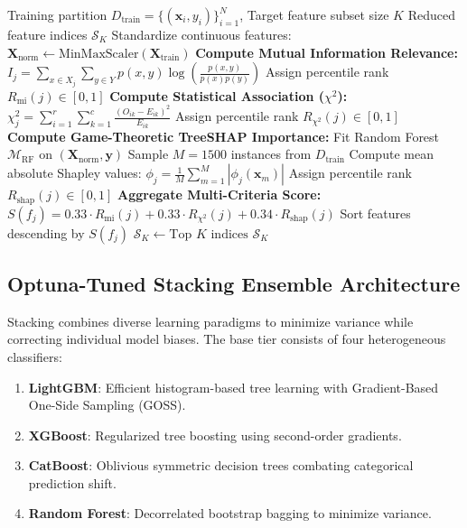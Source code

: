 \documentclass[journal]{IEEEtran}
\begin{document}
\begin{algorithm}[h]
\caption{Leakage-Aware Hybrid Feature Selection}
\label{alg:feature_selection}
\begin{algorithmic}[1]
\REQUIRE Training partition $D_{\text{train}} = \{(\mathbf{x}_i, y_i)\}_{i=1}^N$, Target feature subset size $K$
\ENSURE Reduced feature indices $\mathcal{S}_K$
\STATE Standardize continuous features: $\mathbf{X}_{\text{norm}} \leftarrow \text{MinMaxScaler}(\mathbf{X}_{\text{train}})$
\STATE \textbf{Compute Mutual Information Relevance:}
    \STATE $I_j = \sum_{x \in X_j} \sum_{y \in Y} p(x, y) \log \left( \frac{p(x, y)}{p(x)p(y)} \right)$
    \STATE Assign percentile rank $R_{\text{mi}}(j) \in [0, 1]$
\ENDFOR
\STATE \textbf{Compute Statistical Association ($\chi^2$):}
    \STATE $\chi^2_j = \sum_{i=1}^r \sum_{k=1}^c \frac{(O_{ik} - E_{ik})^2}{E_{ik}}$
    \STATE Assign percentile rank $R_{\chi^2}(j) \in [0, 1]$
\ENDFOR
\STATE \textbf{Compute Game-Theoretic TreeSHAP Importance:}
\STATE Fit Random Forest $\mathcal{M}_{\text{RF}}$ on $(\mathbf{X}_{\text{norm}}, \mathbf{y})$
\STATE Sample $M = 1500$ instances from $D_{\text{train}}$
\STATE Compute mean absolute Shapley values: $\phi_j = \frac{1}{M}\sum_{m=1}^M |\phi_j(\mathbf{x}_m)|$
\STATE Assign percentile rank $R_{\text{shap}}(j) \in [0, 1]$
\STATE \textbf{Aggregate Multi-Criteria Score:}
    \STATE $S(f_j) = 0.33 \cdot R_{\text{mi}}(j) + 0.33 \cdot R_{\chi^2}(j) + 0.34 \cdot R_{\text{shap}}(j)$
\ENDFOR
\STATE Sort features descending by $S(f_j)$
\STATE $\mathcal{S}_K \leftarrow \text{Top } K \text{ indices}$
\RETURN $\mathcal{S}_K$
\end{algorithmic}
\end{algorithm}

\subsection{Optuna-Tuned Stacking Ensemble Architecture}
Stacking combines diverse learning paradigms to minimize variance while correcting individual model biases. The base tier consists of four heterogeneous classifiers:
\begin{enumerate}
    \item \textbf{LightGBM}: Efficient histogram-based tree learning with Gradient-Based One-Side Sampling (GOSS).
    \item \textbf{XGBoost}: Regularized tree boosting using second-order gradients.
    \item \textbf{CatBoost}: Oblivious symmetric decision trees combating categorical prediction shift.
    \item \textbf{Random Forest}: Decorrelated bootstrap bagging to minimize variance.
\end{enumerate}
\end{document}
